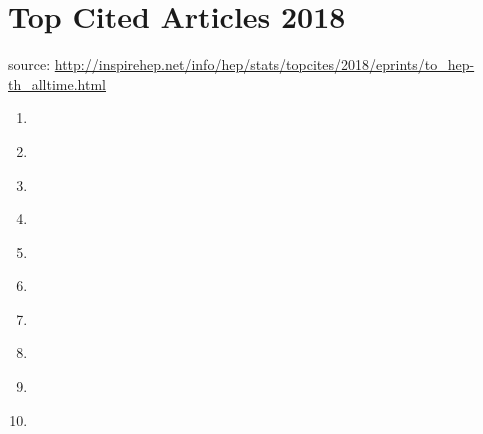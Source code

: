 \documentclass{article}
\begin{document}
\section*{Top Cited Articles 2018}
source: \url{http://inspirehep.net/info/hep/stats/topcites/2018/eprints/to_hep-th_alltime.html}

\begin{enumerate}
	\item \cite{Maldacena:1997re}
	\item \cite{Witten:1998qj}
	\item \cite{Gubser:1998bc}
	\item \cite{Randall:1999vf}
	\item \cite{Aharony:1999ti}
	\item \cite{Seiberg:1999vs}
	\item \cite{Copeland:2006wr}
	\item \cite{Seiberg:1994rs}
	\item \cite{Witten:1998zw}
	\item \cite{GellMann:1980vs}
\end{enumerate}


\end{document}
